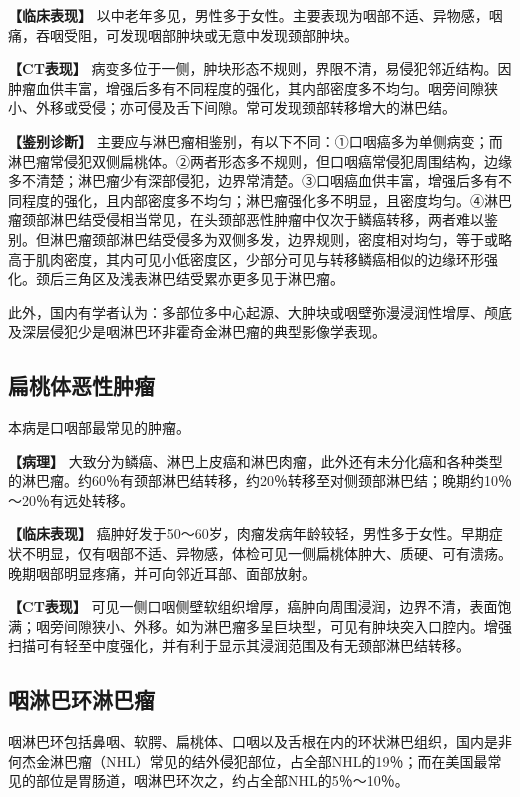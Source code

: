 \textbf{【临床表现】}
以中老年多见，男性多于女性。主要表现为咽部不适、异物感，咽痛，吞咽受阻，可发现咽部肿块或无意中发现颈部肿块。

\textbf{【CT表现】}
病变多位于一侧，肿块形态不规则，界限不清，易侵犯邻近结构。因肿瘤血供丰富，增强后多有不同程度的强化，其内部密度多不均匀。咽旁间隙狭小、外移或受侵；亦可侵及舌下间隙。常可发现颈部转移增大的淋巴结。

\textbf{【鉴别诊断】}
主要应与淋巴瘤相鉴别，有以下不同：①口咽癌多为单侧病变；而淋巴瘤常侵犯双侧扁桃体。②两者形态多不规则，但口咽癌常侵犯周围结构，边缘多不清楚；淋巴瘤少有深部侵犯，边界常清楚。③口咽癌血供丰富，增强后多有不同程度的强化，且内部密度多不均匀；淋巴瘤强化多不明显，且密度均匀。④淋巴瘤颈部淋巴结受侵相当常见，在头颈部恶性肿瘤中仅次于鳞癌转移，两者难以鉴别。但淋巴瘤颈部淋巴结受侵多为双侧多发，边界规则，密度相对均匀，等于或略高于肌肉密度，其内可见小低密度区，少部分可见与转移鳞癌相似的边缘环形强化。颈后三角区及浅表淋巴结受累亦更多见于淋巴瘤。

此外，国内有学者认为：多部位多中心起源、大肿块或咽壁弥漫浸润性增厚、颅底及深层侵犯少是咽淋巴环非霍奇金淋巴瘤的典型影像学表现。

\subsection{扁桃体恶性肿瘤}

本病是口咽部最常见的肿瘤。

\textbf{【病理】}
大致分为鳞癌、淋巴上皮癌和淋巴肉瘤，此外还有未分化癌和各种类型的淋巴瘤。约60％有颈部淋巴结转移，约20％转移至对侧颈部淋巴结；晚期约10％～20％有远处转移。

\textbf{【临床表现】}
癌肿好发于50～60岁，肉瘤发病年龄较轻，男性多于女性。早期症状不明显，仅有咽部不适、异物感，体检可见一侧扁桃体肿大、质硬、可有溃疡。晚期咽部明显疼痛，并可向邻近耳部、面部放射。

\textbf{【CT表现】}
可见一侧口咽侧壁软组织增厚，癌肿向周围浸润，边界不清，表面饱满；咽旁间隙狭小、外移。如为淋巴瘤多呈巨块型，可见有肿块突入口腔内。增强扫描可有轻至中度强化，并有利于显示其浸润范围及有无颈部淋巴结转移。

\subsection{咽淋巴环淋巴瘤}

咽淋巴环包括鼻咽、软腭、扁桃体、口咽以及舌根在内的环状淋巴组织，国内是非何杰金淋巴瘤（NHL）常见的结外侵犯部位，占全部NHL的19％；而在美国最常见的部位是胃肠道，咽淋巴环次之，约占全部NHL的5％～10％。

